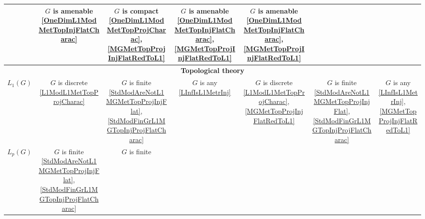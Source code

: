 \documentclass{article}
\theoremstyle{plain}
\theoremstyle{definition}
\begin{document}
\begin{fulltext}
\begin{table}[ht]
\begin{tiny}
\begin{tabular}{|c|c|c|c|c|c|c|}
{            } & 
            \shortstack{
                $G$ is amenable  \\ 
            {\ref{OneDimL1ModMetTopInjFlatCharac}}
            } & 
            \shortstack{
                $G$ is compact  \\ 
            {\ref{OneDimL1ModMetTopProjCharac}},
            {\ref{MGMetTopProjInjFlatRedToL1}}
            } & 
            \shortstack{
                $G$ is amenable  \\ 
            {\ref{OneDimL1ModMetTopInjFlatCharac}},
            {\ref{MGMetTopProjInjFlatRedToL1}}
            } & 
            \shortstack{
                $G$ is amenable  \\ 
            {\ref{OneDimL1ModMetTopInjFlatCharac}},
            {\ref{MGMetTopProjInjFlatRedToL1}}
            } \\ 
        \hline
            \multicolumn{7}{c}{\textbf{Topological theory}} \\
        \hline
            $L_1(G)$ & 
            \shortstack{
                $G$ is discrete \\ 
            {\ref{L1ModL1MetTopProjCharac}}
            } & 
            \shortstack{
                $G$ is finite \\ 
            {\ref{StdModAreNotL1MGMetTopProjInjFlat}},
            {\ref{StdModFinGrL1MGTopInjProjFlatCharac}}
            } & 
            \shortstack{
                $G$ is any \\ 
            {\ref{LInfIsL1MetrInj}}
            } & 
            \shortstack{
                $G$ is discrete \\ 
            {\ref{L1ModL1MetTopProjCharac}},
            {\ref{MGMetTopProjInjFlatRedToL1}}
            } & 
            \shortstack{
                $G$ is finite \\ 
            {\ref{StdModAreNotL1MGMetTopProjInjFlat}},
            {\ref{StdModFinGrL1MGTopInjProjFlatCharac}}
            } & 
            \shortstack{
                $G$ is any \\ 
            {\ref{LInfIsL1MetrInj}},
            {\ref{MGMetTopProjInjFlatRedToL1}}
            } \\ 
        \hline
            $L_p(G)$ & 
            \shortstack{
                $G$ is finite \\ 
            {\ref{StdModAreNotL1MGMetTopProjInjFlat}},
            {\ref{StdModFinGrL1MGTopInjProjFlatCharac}}
            } & 
            \shortstack{
                $G$ is finite \\ 
}
\end{tabular}
\end{tiny}
\end{table}
\end{fulltext}
\end{document}
